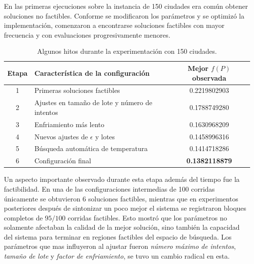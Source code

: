 \documentclass[twoside,11pt]{article}
\begin{document}
En las primeras ejecuciones sobre la instancia de 150 ciudades era común obtener soluciones no factibles. Conforme se modificaron los parámetros y se optimizó la implementación, comenzaron a encontrarse soluciones factibles con mayor frecuencia y con evaluaciones progresivamente menores.

\begin{table}[H]
\centering

\footnotesize
\renewcommand{\arraystretch}{1.15}
\setlength{\tabcolsep}{5pt}

\begin{tabular}{|c|p{8.2cm}|c|}
\hline
\textbf{Etapa} &
\textbf{Característica de la configuración} &
\textbf{Mejor $f(P)$ observada} \\ \hline

1
& Primeras soluciones factibles
& 0.2219802903 \\ \hline

2
& Ajustes en tamaño de lote y número de intentos
& 0.1788749280 \\ \hline

3
& Enfriamiento más lento
& 0.1630968209 \\ \hline

4
& Nuevos ajustes de $\epsilon$ y lotes
& 0.1458996316 \\ \hline

5
& Búsqueda automática de temperatura
& 0.1414718286 \\ \hline

6
& Configuración final
& \textbf{0.1382118879} \\ \hline

\end{tabular}

\caption{Algunos hitos durante la experimentación con 150 ciudades.}
\label{tab:experiment-evolution}

\end{table}



Un aspecto importante observado durante esta etapa además del tiempo fue la factibilidad. En una de las configuraciones intermedias de 100 corridas únicamente se obtuvieron 6 soluciones factibles, mientras que en experimentos posteriores después de sintonizar un poco mejor el sistema se registraron bloques  completos de $95/100$ corridas factibles. Esto mostró que los parámetros no solamente afectaban la calidad de la mejor solución, sino también la capacidad del sistema para terminar en regiones factibles del espacio de búsqueda.
Los parámetros que mas influyeron al ajustar fueron \textit{número máximo de intentos}, \textit{tamaño de lote} y \textit{factor de enfriamiento}, se tuvo un cambio radical en esta. \\
\end{document}
